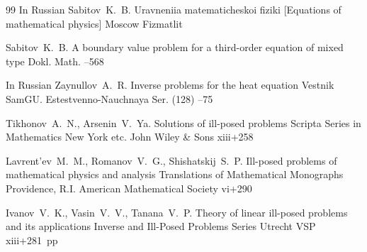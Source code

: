 \begin{thebibliography}{99}
\lang In Russian
\by Sabitov~K.~B.
\book Uravneniia matematicheskoi fiziki \rm [Equations of mathematical physics]
\publaddr Moscow
\publ Fizmatlit


\by Sabitov~K.~B.
\paper A boundary value problem for a third-order equation of mixed type
\jour Dokl. Math.
--568


\lang In Russian
\by Zaynullov~A.~R.
\paper Inverse problems for the heat equation
\jour Vestnik SamGU. Estestvenno-Nauchnaya Ser.
(128)
--75


\by Tikhonov~A.~N., Arsenin~V.~Ya.
\book Solutions of ill-posed problems
\serial Scripta Series in Mathematics
\publaddr New York etc.
\publ John Wiley \& Sons
\totalpages xiii+258 

\by Lavrent'ev~M.~M., Romanov~V.~G., Shishatskij~S.~P.
\book Ill-posed problems of mathematical physics and analysis
\serial Translations of Mathematical Monographs
\publaddr Providence, R.I.
\publ American Mathematical Society 
\totalpages vi+290 

\by Ivanov~V.~K., Vasin~V.~V., Tanana~V.~P.
\book Theory of linear ill-posed problems and its applications
\serial Inverse and Ill-Posed Problems Series
\publaddr Utrecht
\publ VSP 
xiii+281~pp 


\end{thebibliography}

\RuDate


\newpage
\Russian

%
%
